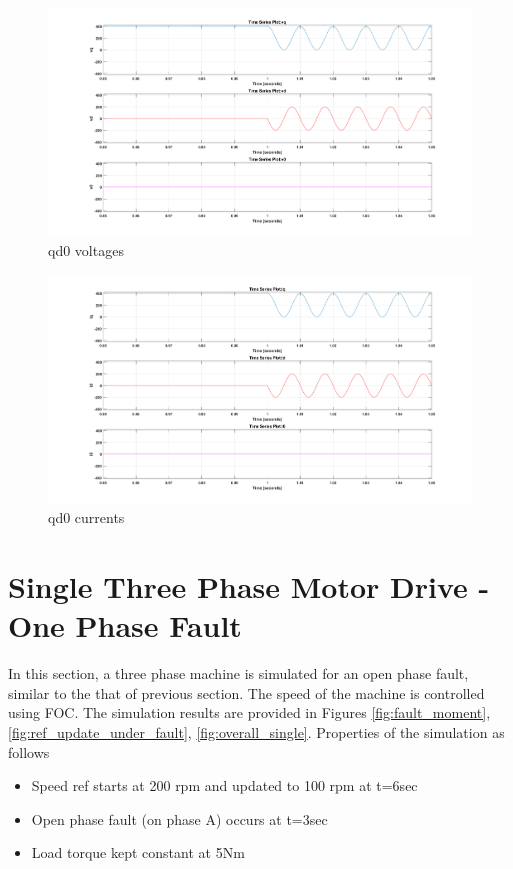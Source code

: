 \documentclass{article}
\begin{document}
\begin{figure}[h!]
\centering
\includegraphics[scale=0.35]{Figures/ResistiveLoad/Vqd0.png}
\caption{qd0 voltages}
\label{fig:ResistiveLoad_Vqd0}
\end{figure}


\begin{figure}[h!]
\centering
\includegraphics[scale=0.35]{Figures/ResistiveLoad/Iqd0.png}
\caption{qd0 currents}
\label{fig:ResistiveLoad_Iqd0}
\end{figure}


\section{Single Three Phase Motor Drive - One Phase Fault}
In this section, a three phase machine is simulated for an open phase fault, similar to the that of previous section. The speed of the machine is controlled using FOC. The simulation results are provided in Figures \ref{fig:fault_moment}, \ref{fig:ref_update_under_fault}, \ref{fig:overall_single}. Properties of the simulation as follows
\begin{itemize}
    \item Speed ref starts at 200 rpm and updated to 100 rpm at t=6sec
    \item Open phase fault (on phase A) occurs at t=3sec
    \item Load torque kept constant at 5Nm
\end{itemize}
\end{document}

